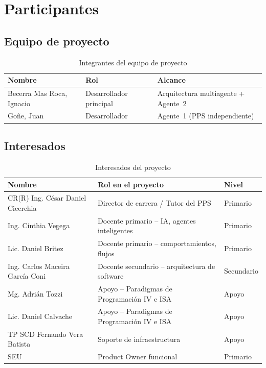 \documentclass[a4paper, 12pt]{article}
\begin{document}
\section{Participantes}

\subsection{Equipo de proyecto}

\begin{table}[htbp]
  \centering
  \caption{Integrantes del equipo de proyecto}
  \label{tab:equipo}
  \begin{tabularx}{\textwidth}{lXl}
    \toprule
    \textbf{Nombre} & \textbf{Rol} & \textbf{Alcance} \\
    \midrule
    Becerra Mas Roca, Ignacio & Desarrollador principal & Arquitectura multiagente + Agente~2 \\
    Go\~ne, Juan              & Desarrollador           & Agente~1 (PPS independiente) \\
    \bottomrule
  \end{tabularx}
\end{table}

\subsection{Interesados}

\begin{table}[htbp]
  \centering
  \caption{Interesados del proyecto}
  \label{tab:interesados}
  \begin{tabularx}{\textwidth}{l>{\raggedright\arraybackslash}Xl}
    \toprule
    \textbf{Nombre} & \textbf{Rol en el proyecto} & \textbf{Nivel} \\
    \midrule
    CR(R) Ing. C\'esar Daniel Cicerchia & Director de carrera / Tutor del PPS    & Primario \\
    Ing. Cinthia Vegega                  & Docente primario -- IA, agentes inteligentes        & Primario \\
    Lic. Daniel Britez                   & Docente primario -- comportamientos, flujos          & Primario \\
    Ing. Carlos Maceira Garc\'ia Coni    & Docente secundario -- arquitectura de software       & Secundario \\
    Mg. Adri\'an Tozzi                   & Apoyo -- Paradigmas de Programaci\'on IV e ISA       & Apoyo \\
    Lic. Daniel Calvache                 & Apoyo -- Paradigmas de Programaci\'on IV e ISA       & Apoyo \\
    TP SCD Fernando Vera Batista         & Soporte de infraestructura                           & Apoyo \\
    \ac{SEU}                             & Product Owner funcional                & Primario \\
    \bottomrule
  \end{tabularx}
\end{table}
\end{document}

